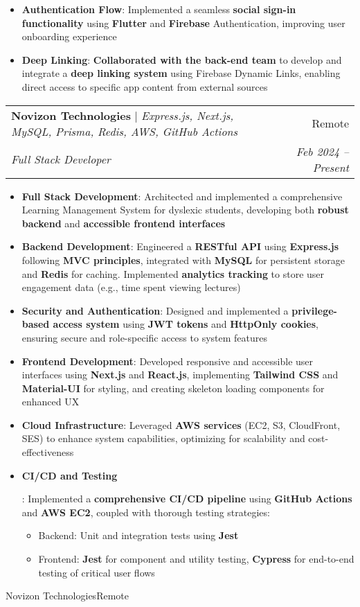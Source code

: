 \documentclass[letterpaper,10pt]{article}
\makeatletter
\newcommand{\resumeItem}[2]{
  \item\small{
    \textbf{#1}{: #2 \vspace{-2pt}}
  }
}
\newcommand{\resumeSubheading}[5]{
  \vspace{-1pt}\item
    \begin{tabular*}{0.97\textwidth}{l@{\extracolsep{\fill}}r}
      \textbf{#1} #5 & #2 \\
      \textit{\small#3} & \textit{\small #4} \\
    \end{tabular*}\vspace{-5pt}
}
\newcommand{\resumeItemListStart}{\begin{itemize}}
\newcommand{\resumeItemListEnd}{\end{itemize}\vspace{-5pt}}
\makeatother
\begin{document}
{      \resumeItemListStart
        \resumeItem{Authentication Flow}
        {Implemented a seamless \textbf{social sign-in functionality} using \textbf{Flutter} and \textbf{Firebase} Authentication, improving user onboarding experience}
        \resumeItem{Deep Linking}
        {\textbf{Collaborated with the back-end team} to develop and integrate a \textbf{deep linking system} using Firebase Dynamic Links, enabling direct access to specific app content from external sources}
      \resumeItemListEnd
    \resumeSubheading
  {Novizon Technologies}{Remote}
  {Full Stack Developer}{Feb 2024 -- Present}{| \textit{Express.js, Next.js, MySQL, Prisma, Redis, AWS, GitHub Actions}}
  \resumeItemListStart
    \resumeItem{Full Stack Development}
    {Architected and implemented a comprehensive Learning Management System for dyslexic students, developing both \textbf{robust backend} and \textbf{accessible frontend interfaces}}
    \resumeItem{Backend Development}
    {Engineered a \textbf{RESTful API} using \textbf{Express.js} following \textbf{MVC principles}, integrated with \textbf{MySQL} for persistent storage and \textbf{Redis} for caching. Implemented \textbf{analytics tracking} to store user engagement data (e.g., time spent viewing lectures)}
    \resumeItem{Security and Authentication}
    {Designed and implemented a \textbf{privilege-based access system} using \textbf{JWT tokens} and \textbf{HttpOnly cookies}, ensuring secure and role-specific access to system features}
    \resumeItem{Frontend Development}
    {Developed responsive and accessible user interfaces using \textbf{Next.js} and \textbf{React.js}, implementing \textbf{Tailwind CSS} and \textbf{Material-UI} for styling, and creating skeleton loading components for enhanced UX}
    \resumeItem{Cloud Infrastructure}
    {Leveraged \textbf{AWS services} (EC2, S3, CloudFront, SES) to enhance system capabilities, optimizing for scalability and cost-effectiveness}
    \resumeItem{CI/CD and Testing}
    {Implemented a \textbf{comprehensive CI/CD pipeline} using \textbf{GitHub Actions} and \textbf{AWS EC2}, coupled with thorough testing strategies:
    \begin{itemize}
      \item Backend: Unit and integration tests using \textbf{Jest}
      \item Frontend: \textbf{Jest} for component and utility testing, \textbf{Cypress} for end-to-end testing of critical user flows
    \end{itemize}}
  \resumeItemListEnd 
    \resumeSubheading
  {Novizon Technologies}{Remote}
}
\end{document}
